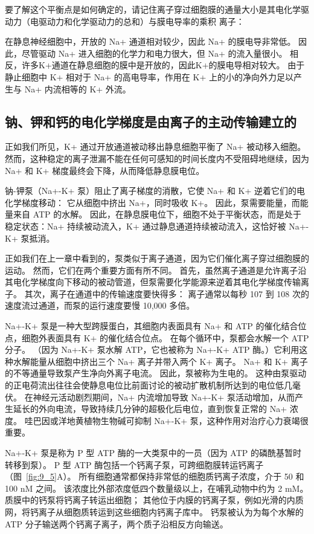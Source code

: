 要了解这个平衡点是如何确定的，请记住离子穿过细胞膜的通量大小是其电化学驱动力（电驱动力和化学驱动力的总和）与膜电导率的乘积 离子：


在静息神经细胞中，开放的 Na+ 通道相对较少，因此 Na+ 的膜电导非常低。
因此，尽管驱动 Na+ 进入细胞的化学力和电力很大，但 Na+ 的流入量很小。
相反，许多K+通道在静息细胞的膜中是开放的，因此K+的膜电导相对较大。
由于静止细胞中 K+ 相对于 Na+ 的高电导率，作用在 K+ 上的小的净向外力足以产生与 Na+ 内流相等的 K+ 外流。



\subsection{钠、钾和钙的电化学梯度是由离子的主动传输建立的}

正如我们所见，K+ 通过开放通道被动移出静息细胞平衡了 Na+ 被动移入细胞。
然而，这种稳定的离子泄漏不能在任何可感知的时间长度内不受阻碍地继续，因为 Na+ 和 K+ 梯度最终会下降，从而降低静息膜电位。


钠-钾泵（Na+-K+ 泵）阻止了离子梯度的消散，它使 Na+ 和 K+ 逆着它们的电化学梯度移动：
它从细胞中挤出 Na+，同时吸收 K+。
因此，泵需要能量，而能量来自 ATP 的水解。
因此，在静息膜电位下，细胞不处于平衡状态，而是处于稳定状态：Na+ 持续被动流入，K+ 通过静息通道持续被动流入，这恰好被 Na+-K+ 泵抵消。


正如我们在上一章中看到的，泵类似于离子通道，因为它们催化离子穿过细胞膜的运动。
然而，它们在两个重要方面有所不同。
首先，虽然离子通道是允许离子沿其电化学梯度向下移动的被动管道，但泵需要化学能源来逆着其电化学梯度传输离子。
其次，离子在通道中的传输速度要快得多：
离子通常以每秒 107 到 108 次的速度流过通道，而泵的运行速度要慢 10,000 多倍。


Na+-K+ 泵是一种大型跨膜蛋白，其细胞内表面具有 Na+ 和 ATP 的催化结合位点，细胞外表面具有 K+ 的催化结合位点。
在每个循环中，泵都会水解一个 ATP 分子。
（因为 Na+-K+ 泵水解 ATP，它也被称为 Na+-K+ ATP 酶。）它利用这种水解能量从细胞中挤出三个 Na+ 离子并带入两个 K+ 离子。
Na+ 和 K+ 离子的不等通量导致泵产生净向外离子电流。
因此，泵被称为生电的。
这种由泵驱动的正电荷流出往往会使静息电位比前面讨论的被动扩散机制所达到的电位低几毫伏。
在神经元活动剧烈期间，Na+ 内流增加导致 Na+-K+ 泵活动增加，从而产生延长的外向电流，导致持续几分钟的超极化后电位，直到恢复正常的 Na+ 浓度。
哇巴因或洋地黄植物生物碱可抑制 Na+-K+ 泵，这种作用对治疗心力衰竭很重要。


Na+-K+ 泵是称为 P 型 ATP 酶的一大类泵中的一员（因为 ATP 的磷酰基暂时转移到泵）。
P 型 ATP 酶包括一个钙离子泵，可跨细胞膜转运钙离子（图~\ref{fig:9_5}A）。
所有细胞通常都保持非常低的细胞质钙离子浓度，介于 50 和 100 nM 之间。
该浓度比外部浓度低四个数量级以上，在哺乳动物中约为 2 mM。
质膜中的钙泵将钙离子转运出细胞；
其他位于内膜的钙离子泵，例如光滑的内质网，将钙离子从细胞质转运到这些细胞内钙离子库中。
钙泵被认为为每个水解的 ATP 分子输送两个钙离子离子，两个质子沿相反方向输送。


